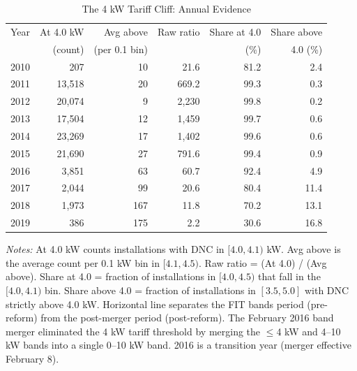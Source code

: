 \begin{table}[t]
\centering
\caption{The 4 kW Tariff Cliff: Annual Evidence}
\label{tab:cliff}
\begin{tabular}{lrrrrr}
\toprule
Year & At 4.0 kW & Avg above & Raw ratio & Share at 4.0 & Share above \\
 & (count) & (per 0.1 bin) & & (\%) & 4.0 (\%) \\
\midrule
  2010 & 207 & 10 & 21.6 & 81.2 & 2.4 \\
  2011 & 13,518 & 20 & 669.2 & 99.3 & 0.3 \\
  2012 & 20,074 & 9 & 2,230 & 99.8 & 0.2 \\
  2013 & 17,504 & 12 & 1,459 & 99.7 & 0.6 \\
  2014 & 23,269 & 17 & 1,402 & 99.6 & 0.6 \\
  2015 & 21,690 & 27 & 791.6 & 99.4 & 0.9 \\
  \midrule

  2016 & 3,851 & 63 & 60.7 & 92.4 & 4.9 \\
  2017 & 2,044 & 99 & 20.6 & 80.4 & 11.4 \\
  2018 & 1,973 & 167 & 11.8 & 70.2 & 13.1 \\
  2019 & 386 & 175 & 2.2 & 30.6 & 16.8 \\
\bottomrule
\end{tabular}

\begin{flushleft}\small \textit{Notes:} At 4.0 kW counts installations with DNC in $[4.0, 4.1)$ kW. Avg above is the average count per 0.1 kW bin in $[4.1, 4.5)$. Raw ratio = (At 4.0) / (Avg above). Share at 4.0 = fraction of installations in $[4.0, 4.5)$ that fall in the $[4.0, 4.1)$ bin. Share above 4.0 = fraction of installations in $[3.5, 5.0]$ with DNC strictly above 4.0 kW. Horizontal line separates the FIT bands period (pre-reform) from the post-merger period (post-reform). The February 2016 band merger eliminated the 4 kW tariff threshold by merging the $\leq$4 kW and 4--10 kW bands into a single 0--10 kW band. 2016 is a transition year (merger effective February 8).\end{flushleft}
\end{table}
